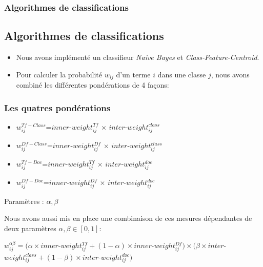 \documentclass[12pt]{beamer}
\begin{document}
\begin{frame}
\frametitle{Algorithmes de classifications}
\subsection{Algorithmes de classifications}
\begin{itemize}
\item Nous avons implémenté un classifieur \textit{Naive Bayes} et \textit{Class-Feature-Centroid}. 
\item Pour calculer la probabilité $w_{ij}$ d'un terme $i$ dans une classe $j$, nous avons combiné les différentes pondérations de 4 façons:
\end{itemize}

\end{frame}
\begin{frame}
\frametitle{Les quatres pondérations}

\begin{itemize}
\item $w_{ij}^{Tf-Class}$=$inner$-$weight_{ij}^{Tf}$ $\times$ $inter$-$weight_{ij}^{class}$
\item $w_{ij}^{Df-Class}$=$inner$-$weight_{ij}^{Df}$ $\times$ $inter$-$weight_{ij}^{class}$
\item $w_{ij}^{Tf-Doc}$=$inner$-$weight_{ij}^{Tf}$ $\times$ $inter$-$weight_{ij}^{doc}$
\item $w_{ij}^{Df-Doc}$=$inner$-$weight_{ij}^{Df}$ $\times$ $inter$-$weight_{ij}^{doc}$
\end{itemize}
\begin{block}{Paramètres : $\alpha,\beta$}


Nous avons aussi mis en place une combinaison de ces mesures dépendantes de deux paramètres $\alpha,\beta \in [0,1]$:
\begin{center}
 $w_{ij}^{ \alpha \beta}=(\alpha \times inner$-$weight_{ij}^{Tf} + (1-\alpha)\times inner$-$weight_{ij}^{Df} )\times(\beta \times inter$-$weight_{ij}^{class} + (1-\beta) \times inter$-$weight_{ij}^{doc} )$
\end{center}
\end{block}
\end{frame}
\end{document}
